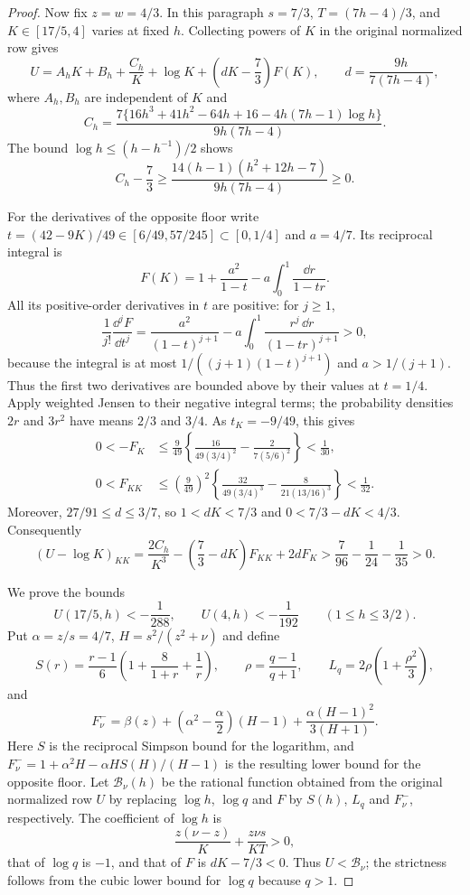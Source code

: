 \begin{proof}
Now fix $z=w=4/3$. In this paragraph $s=7/3$,
$T=(7h-4)/3$, and $K\in[17/5,4]$ varies at fixed $h$.
Collecting powers of $K$ in the original normalized row gives
\[
 U=A_hK+B_h+\frac{C_h}{K}+\log K
                          +\left(dK-\frac73\right)F(K),
 \qquad d=\frac{9h}{7(7h-4)},
\]
where $A_h,B_h$ are independent of $K$ and
\[
 C_h=\frac{7\{16h^3+41h^2-64h+16-4h(7h-1)\log h\}}
                 {9h(7h-4)}.
\]
The bound $\log h\le(h-h^{-1})/2$ shows
\[
 C_h-\frac73
 \ge\frac{14(h-1)(h^2+12h-7)}{9h(7h-4)}\ge0.
\]

For the derivatives of the opposite floor write
$t=(42-9K)/49\in[6/49,57/245]\subset[0,1/4]$ and $a=4/7$.
Its reciprocal integral is
\[
 F(K)=1+\frac{a^2}{1-t}
                  -a\int_0^1\frac{\dd r}{1-tr}.
\]
All its positive-order derivatives in $t$ are positive: for $j\ge1$,
\[
 \frac1{j!}\frac{\dd^j F}{\dd t^j}
 =\frac{a^2}{(1-t)^{j+1}}
       -a\int_0^1\frac{r^j\,\dd r}{(1-tr)^{j+1}}>0,
\]
because the integral is at most
$1/((j+1)(1-t)^{j+1})$ and $a>1/(j+1)$.
Thus the first two derivatives are bounded above by their values at
$t=1/4$. Apply weighted Jensen to their negative integral terms;
the probability densities $2r$ and $3r^2$ have means $2/3$ and $3/4$.
As $t_K=-9/49$, this gives
\begin{align*}
 0<-F_K
 &\le\frac9{49}\left\{
       \frac{16}{49(3/4)^2}-\frac{2}{7(5/6)^2}\right\}<\frac1{30},\\
 0<F_{KK}
 &\le\left(\frac9{49}\right)^2\left\{
       \frac{32}{49(3/4)^3}-\frac{8}{21(13/16)^3}\right\}<\frac1{32}.
\end{align*}
Moreover, $27/91\le d\le3/7$, so $1<dK<7/3$ and
$0<7/3-dK<4/3$. Consequently
\[
 (U-\log K)_{KK}
 =\frac{2C_h}{K^3}-\left(\frac73-dK\right)F_{KK}+2dF_K
 >\frac7{96}-\frac1{24}-\frac1{35}>0.
\]

We prove the bounds
\[
 U(17/5,h)<-\frac1{288},\qquad U(4,h)<-\frac1{192}
 \qquad(1\le h\le3/2).
\]
Put $\alpha=z/s=4/7$, $H=s^2/(z^2+\nu)$ and define
\[
 S(r)=\frac{r-1}{6}\left(1+\frac8{1+r}+\frac1r\right),\qquad
 \rho=\frac{q-1}{q+1},\qquad L_q=2\rho\left(1+\frac{\rho^2}3\right),
\]
and
\[
 F^-_\nu=\beta(z)+\left(\alpha^2-\frac\alpha2\right)(H-1)
                    +\frac{\alpha(H-1)^2}{3(H+1)}.
\]
Here $S$ is the reciprocal Simpson bound for the logarithm, and
$F^-_\nu=1+\alpha^2H-\alpha H S(H)/(H-1)$ is the resulting
lower bound for the opposite floor.
Let $\mathcal B_\nu(h)$ be the rational function obtained from the original
normalized row $U$ by replacing $\log h$, $\log q$ and $F$ by
$S(h)$, $L_q$ and $F^-_\nu$, respectively.
The coefficient of $\log h$ is
\[
 \frac{z(\nu-z)}K+\frac{z\nu s}{KT}>0,
\]
that of $\log q$ is $-1$, and that of $F$ is $dK-7/3<0$.
Thus $U<\mathcal B_\nu$; the strictness follows from the cubic
lower bound for $\log q$ because $q>1$.


\end{proof}
